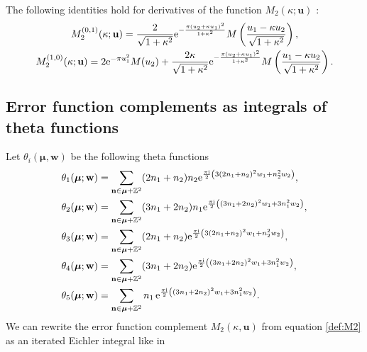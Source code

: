 \documentclass[pdftex]{sigma}
\def\BZ{\mathbb{Z}}
\def\bmu{\boldsymbol{\mu}}
\theoremstyle{definition}
\numberwithin{equation}{section}
\begin{document}
The following identities hold for derivatives of the function $M_2(\kappa ; \mathbf{u})$ \cite{Alexandrov:2016enp}:
\begin{gather*}%
M_2^{(0,1)}(\kappa ; \mathbf{u}) = \frac{2}{ \sqrt{1+\kappa^2} } {\rm e}^{- \frac{\pi (u_2+\kappa u_1)^2}{1+\kappa^2}}
M\left( \frac{u_1 - \kappa u_2}{\sqrt{1+\kappa^2}} \right),\\
M_2^{(1,0)}(\kappa ; \mathbf{u}) = 2 {\rm e}^{-\pi u_1^2} M(u_2) +
\frac{2\kappa}{\sqrt{1+\kappa^2}}
{\rm e}^{- \frac{\pi (u_2+\kappa u_1)^2}{1+\kappa^2}}
M\left( \frac{u_1 - \kappa u_2}{\sqrt{1+\kappa^2}} \right) .
\end{gather*}

\subsection*{Error function complements as integrals of theta functions}
Let $\theta_{i} ( \bmu,\mathbf{w} )$ be the following theta functions
\begin{align}
	\theta_1(\boldsymbol{\mu} ; \mathbf{w}) &= \sum_{\mathbf{n} \in \boldsymbol{\mu} + \BZ^2} (2n_1 + n_2) n_2 {\rm e}^{\frac{\pi {\rm i}}{2} \left( 3(2n_1 + n_2)^2 w_1 + n_2^2 w_2 \right)},\nonumber\\
	\theta_2(\boldsymbol{\mu} ; \mathbf{w}) &= \sum_{\mathbf{n} \in \boldsymbol{\mu} + \BZ^2} (3n_1 + 2n_2) n_1
	{\rm e}^{\frac{\pi {\rm i}}{2} \left( (3n_1 + 2n_2)^2 w_1 + 3n_1^2 w_2 \right)},\nonumber\\
	\theta_3 (\boldsymbol{\mu};\mathbf{w}) &= \sum_{\mathbf{n} \in \boldsymbol{\mu} + \BZ^2} (2n_1 + n_2)
	{\rm e}^{\frac{\pi {\rm i}}{2} \left( 3(2n_1 + n_2)^2 w_1 + n_2^2 w_2 \right)},\nonumber\\
	\theta_4 (\boldsymbol{\mu};\mathbf{w}) &= \sum_{\mathbf{n} \in \boldsymbol{\mu} + \BZ^2} (3n_1 + 2n_2)
	{\rm e}^{\frac{\pi {\rm i}}{2} \left( (3n_1 + 2n_2)^2 w_1 + 3n_1^2 w_2 \right)},\nonumber\\
	\theta_5 (\boldsymbol{\mu};\mathbf{w}) &= \sum_{\mathbf{n} \in \boldsymbol{\mu} + \BZ^2} n_1 \,
	{\rm e}^{\frac{\pi {\rm i}}{2} \left( (3n_1 + 2n_2)^2 w_1 + 3n_1^2 w_2 \right)} .\label{def:thetaellalw}
\end{align}
We can rewrite the error function complement $M_{2}\left( \kappa,\mathbf{u} \right)$ from equation \eqref{def:M2} as an iterated Eichler integral like in \cite{bringmann2018higher}
\end{document}
